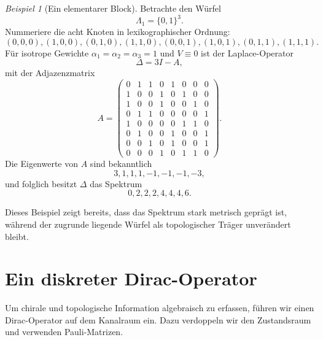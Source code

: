 \documentclass[11pt,a4paper]{article}
\theoremstyle{remark}
\newtheorem{beispiel}[definition]{Beispiel}
\begin{document}
	\begin{beispiel}[Ein elementarer Block]
		Betrachte den Würfel
		\begin{equation}
			\Lambda_1=\{0,1\}^3.
		\end{equation}
		Nummeriere die acht Knoten in lexikographischer Ordnung:
		\begin{equation}
			(0,0,0),(1,0,0),(0,1,0),(1,1,0),(0,0,1),(1,0,1),(0,1,1),(1,1,1).
		\end{equation}
		Für isotrope Gewichte $\alpha_1=\alpha_2=\alpha_3=1$ und $V\equiv 0$ ist der Laplace-Operator
		\begin{equation}
			\Delta = 3I - A,
		\end{equation}
		mit der Adjazenzmatrix
		\begin{equation}
			A=
			\begin{pmatrix}
				0&1&1&0&1&0&0&0\\
				1&0&0&1&0&1&0&0\\
				1&0&0&1&0&0&1&0\\
				0&1&1&0&0&0&0&1\\
				1&0&0&0&0&1&1&0\\
				0&1&0&0&1&0&0&1\\
				0&0&1&0&1&0&0&1\\
				0&0&0&1&0&1&1&0
			\end{pmatrix}.
		\end{equation}
		Die Eigenwerte von $A$ sind bekanntlich
		\begin{equation}
			3,1,1,1,-1,-1,-1,-3,
		\end{equation}
		und folglich besitzt $\Delta$ das Spektrum
		\begin{equation}
			0,2,2,2,4,4,4,6.
		\end{equation}
	\end{beispiel}
	
	Dieses Beispiel zeigt bereits, dass das Spektrum stark metrisch geprägt ist, während der zugrunde liegende Würfel als topologischer Träger unverändert bleibt.
	
	\section{Ein diskreter Dirac-Operator}
	
	Um chirale und topologische Information algebraisch zu erfassen, führen wir einen Dirac-Operator auf dem Kanalraum ein. Dazu verdoppeln wir den Zustandsraum und verwenden Pauli-Matrizen.
	
\end{document}

